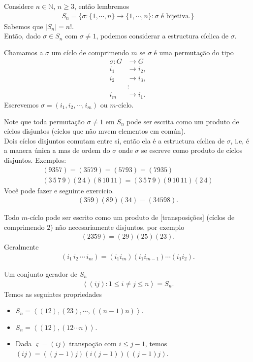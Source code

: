 Considere $n\in\mathbb{N}$, $n\geq 3$, então lembremos
\begin{align*}
  S_n=\{\sigma:\{1,\cdots,n\}\to\{1,\cdots,n\}:\sigma\text{ é bijetiva.}\}
\end{align*}
Sabemos que $|S_n|=n!$.\\
Então, dado  $\sigma\in S_n$ com $\sigma\neq 1$, podemos considerar a estructura cíclica de $\sigma$.
\begin{definition}
  Chamamos a $\sigma$ um cíclo de comprimendo $m$ se $\sigma$ é uma permutação do tipo
  \begin{align*}
    \sigma:G&\to G\\
    i_1&\to i_2,\\
    i_2&\to i_3,\\
    &\vdots\\
    i_m&\to i_1.
  \end{align*}
  Escrevemos $\sigma=(i_1,i_2,\cdots,i_m)$ ou $m$-cíclo. 
\end{definition}
Note que toda permutação $\sigma\neq 1$ em $S_n$ pode ser escrita como um produto de cíclos disjuntos (cíclos que não mvem elementos em común).\\
Dois cíclos disjuntos comutam entre sí, então ela é a estructura cíclica de $\sigma$, i.e, é a manera única a mas de ordem do $\sigma$ onde $\sigma$ se escreve como produto de cíclos disjuntos.
Exemplos: 
\begin{align*}
  (9357)=(3579)=(5793)=(7935)\\
  (3\,5\,7\,9)(2\,4)(8\, 10\, 11)=(3\, 5\, 7\, 9)(9\, 10\, 11)(2\, 4)
\end{align*}
Você pode fazer e seguinte exercicio.
\begin{align*}
  (359)(89)(34)=(34598).
\end{align*}
\begin{note}
  Todo $m$-cíclo pode ser escrito como um produto de [transposições] (cíclos de comprimendo $2$) não necesariamente disjuntos, por exemplo
  \begin{align*}
    (2359)=(29)(25)(23).
  \end{align*}
  Geralmente 
  \begin{align*}
    (i_1\, i_2\, \cdots\, i_m)=(i_1i_m)(i_1i_{m-1})\cdots (i_1i_2).
  \end{align*}
\end{note}
\begin{note}[Propriedades de $S_n$]\label{note:propriedades-gerador-Sn}
  Um conjunto gerador de $S_n$
  \begin{align*}
    \left\langle (ij):1\leq i\neq j\leq n \right\rangle=S_n.
  \end{align*}
  Temos as seguintes propriedades
  \begin{itemize}
    \item $S_n=\left\langle (12),(23),\cdots,((n-1) n) \right\rangle$.
    \item $S_n=\left\langle (12),(12\cdots n) \right\rangle$.
    \item Dada $\varsigma=(ij)$ transpoção com $i\leq j-1$, temos $(ij)=((j-1)j)(i(j-1))((j-1)j)$. 
  \end{itemize}
\end{note}

